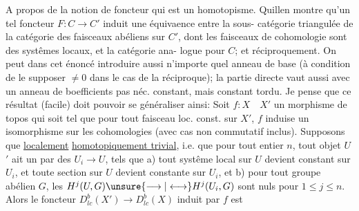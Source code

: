 A propos de la notion de foncteur qui est un homotopisme. Quillen
montre qu'un tel foncteur $F:C\longrightarrow C'$ induit une équivaence entre la sous-
catégorie triangulée  de la catégorie  des faisceaux abéliens sur $C'$, dont
les faisceaux de cohomologie sont des systêmes locaux, et la catégorie ana-
logue pour $C$;  et réciproquement.  On peut
dans cet énoncé introduire aussi n'importe quel anneau de base (à condition
de le supposer $\neq 0$ dans le cas de la réciproque);  la partie directe
vaut aussi avec un anneau de boefficients pas néc. constant, mais constant
tordu. Je pense que ce résultat (facile) doit pouvoir se généraliser ainsi:
Soit $f:X\quad X'$ un morphisme de topos qui soit tel que pour tout 
faisceau loc. const. sur $X'$, $f$ induise un isomorphisme sur les cohomologies
(avec cas non commutatif inclus). Supposons que   \uline{localement}
  \uline{homotopiquement trivial}, i.e. que  pour tout entier $n$, tout objet $U$ 
$'$ ait un   par des $U_i\longrightarrow U$, tels que a) tout systême local sur $U$
devient constant sur $U_i$, et toute section sur $U$ devient constante sur $U_i$,
et b) pour tout  groupe abélien $G$, les $H^j(U,G)\unsure{\longrightarrow|\longleftrightarrow} H^j(U_i,G)$ sont
nuls pour $1\leq j\leq n$. Alors le foncteur $D^b_{lc}(X')\longrightarrow D^b_{lc}(X)$ induit par $f$ est

